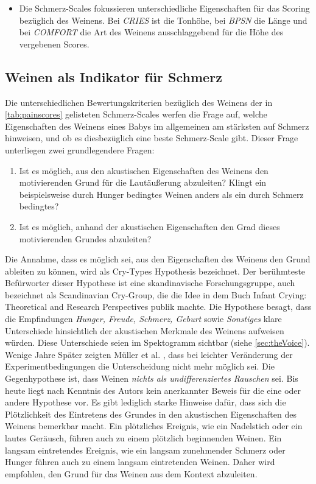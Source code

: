 \begin{itemize}
	\item Die Schmerz-Scales fokussieren unterschiedliche Eigenschaften für das Scoring bezüglich des Weinens. Bei \emph{CRIES} ist die Tonhöhe, bei \emph{BPSN} die Länge und bei \emph{COMFORT} die Art des Weinens ausschlaggebend für die Höhe des vergebenen Scores.
	
\end{itemize}


\subsection{Weinen als Indikator für Schmerz}
\label{sec:foundations_cryingMeta}

Die unterschiedlichen Bewertungskriterien bezüglich des Weinens der in \autoref{tab:painscores} gelisteten Schmerz-Scales werfen die Frage auf, welche Eigenschaften des Weinens eines Babys im allgemeinen am stärksten auf Schmerz hinweisen, und ob es diesbezüglich eine \glqq beste\grqq{} Schmerz-Scale gibt. Dieser Frage unterliegen zwei grundlegendere Fragen:

\begin{enumerate}
	\item Ist es möglich, aus den akustischen Eigenschaften des Weinens den motivierenden Grund für die Lautäußerung abzuleiten?  Klingt ein beispielsweise durch Hunger bedingtes Weinen anders als ein durch Schmerz bedingtes?
	\item Ist es möglich, anhand der akustischen Eigenschaften den \glqq Grad\grqq{} dieses motivierenden Grundes abzuleiten?
\end{enumerate}

Die Annahme, dass es möglich sei, aus den Eigenschaften des Weinens den Grund ableiten zu können, wird als \glqq Cry-Types Hypothesis\grqq{} bezeichnet. Der berühmteste Befürworter dieser Hypothese ist eine skandinavische Forschungsgruppe, auch bezeichnet als \glqq Scandinavian Cry-Group\grqq , die die Idee in dem Buch \glqq Infant Crying: Theoretical and Research Perspectives\grqq \cite{crygroup} publik machte. Die Hypothese besagt, dass die Empfindungen \emph{Hunger, Freude, Schmerz, Geburt} sowie \emph{Sonstiges} klare Unterschiede hinsichtlich der akustischen Merkmale des Weinens aufweisen würden. Diese Unterschiede seien im Spektogramm sichtbar (siehe \autoref{sec:theVoice}). Wenige Jahre Später zeigten Müller et al. \cite{cryisnoise}, dass bei leichter Veränderung der Experimentbedingungen die Unterscheidung nicht mehr möglich sei. Die Gegenhypothese ist, dass Weinen \emph{nichts als undifferenziertes Rauschen} sei.\cite[S. 9 - 13]{signal} Bis heute liegt nach Kenntnis des Autors kein anerkannter Beweis für die eine oder andere Hypothese vor. Es gibt lediglich starke Hinweise dafür, dass sich die Plötzlichkeit des Eintretens des Grundes in den akustischen Eigenschaften des Weinens bemerkbar macht. Ein plötzliches Ereignis, wie ein Nadelstich oder ein lautes Geräusch, führen auch zu einem plötzlich beginnenden Weinen. Ein langsam eintretendes Ereignis, wie ein langsam zunehmender Schmerz oder Hunger führen auch zu einem langsam eintretenden Weinen. Daher wird empfohlen, den Grund für das Weinen aus dem Kontext abzuleiten.\cite[S. 17 - 19]{signal}

